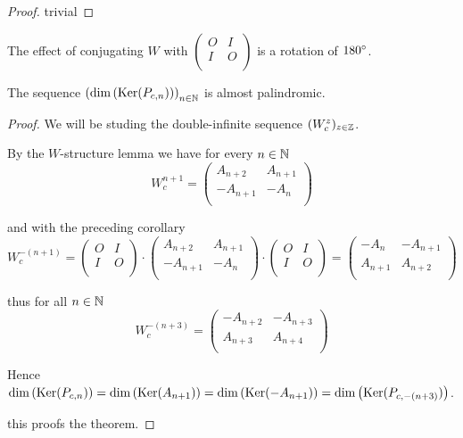 \begin{proof}
  trivial
\end{proof}

\begin{remark}
  The effect of conjugating $W$ with
  $\left(\begin{smallmatrix} O & I \\ I & O \\\end{smallmatrix}\right)$
  is a rotation of $180^{\circ}$.
\end{remark}

\begin{theorem}
  The sequence $\left(\dim\left(\operatorname{Ker}(P_{c,n})\right)\right)_{n\in\mathbb{N}}$
  is almost palindromic.
\end{theorem}

\begin{proof}
  We will be studing the double-infinite sequence
  $(W_{c}^{z})_{z\in\mathbb{Z}}$.

  By the $W$-structure lemma we have for every $n\in\mathbb{N}$
  \[
  W_{c}^{n+1}
  =
  \left(
  \begin{array}{cc}
     A_{n+2} &  A_{n+1} \\
    -A_{n+1} & -A_{n}   \\
  \end{array}
  \right)
  \]

  and with the preceding corollary
  \[
  W_{c}^{-(n+1)}
  =
  \left(
  \begin{array}{cc}
    O & I \\
    I & O \\
  \end{array}
  \right)
  \cdot
  \left(
  \begin{array}{cc}
     A_{n+2} &  A_{n+1} \\
    -A_{n+1} & -A_{n}   \\
  \end{array}
  \right)
  \cdot
  \left(
  \begin{array}{cc}
    O & I \\
    I & O \\
  \end{array}
  \right)
  =
  \left(
  \begin{array}{cc}
    -A_{n}  & -A_{n+1} \\
     A_{n+1} & A_{n+2} \\
  \end{array}
  \right)
  \]

  thus for all $n\in\mathbb{N}$
  \[
  W_{c}^{-(n+3)}
  =
  \left(
  \begin{array}{cc}
    -A_{n+2}  & -A_{n+3} \\
     A_{n+3} & A_{n+4} \\
  \end{array}
  \right)
  \]

  Hence $\dim\left(\operatorname{Ker}(P_{c,n})\right) =
  \dim\left(\operatorname{Ker}(A_{n+1})\right) =
  \dim\left(\operatorname{Ker}(-A_{n+1})\right) =
  \dim\left(\operatorname{Ker}(P_{c,-(n+3)})\right)$.

  this proofs the theorem.
\end{proof}
